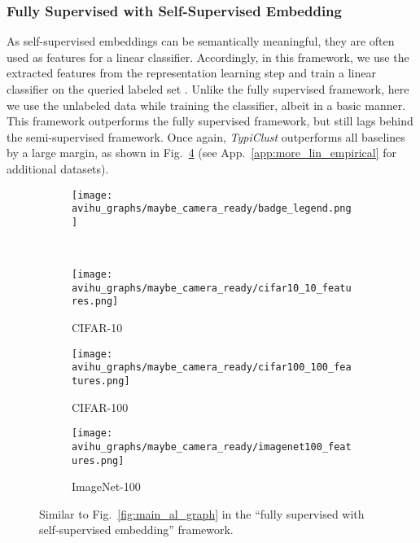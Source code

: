 \documentclass{article}
\newcommand{\app}{App.}
\begin{document}
\subsubsection{Fully Supervised with Self-Supervised Embedding} 
\label{sec:fwork:(ii)}
As self-supervised embeddings can be semantically meaningful, they are often used as features for a linear classifier. Accordingly, in this framework, we use the extracted features from the representation learning step and train a linear classifier on the queried labeled set . Unlike the fully supervised framework, here we use the unlabeled data while training the classifier, albeit in a basic manner. This framework outperforms the fully supervised framework, but still lags behind the semi-supervised framework. Once again, \textit{TypiClust} outperforms all baselines by a large margin, as shown in Fig.~\ref{fig:weak_semi} (see \app~\ref{app:more_lin_empirical} for additional datasets). 



\begin{figure}[htb!]
\begin{center}
\begin{subfigure}{.45\textwidth}
  \centering
 \texttt{[image: avihu\_graphs/maybe\_camera\_ready/badge\_legend.png]}
\end{subfigure}
\\
\begin{subfigure}{.157\textwidth}
      \centering
      \texttt{[image: avihu\_graphs/maybe\_camera\_ready/cifar10\_10\_features.png]}
    \vspace{-0.5cm}
    \caption{CIFAR-10}
    \label{fig:weak_semi_cifar10}
    \end{subfigure}
    \begin{subfigure}{.157\textwidth}
      \centering
      \texttt{[image: avihu\_graphs/maybe\_camera\_ready/cifar100\_100\_features.png]}
    \vspace{-0.5cm}
    \caption{CIFAR-100}
    \label{fig:weak_semi_cifar100}
    \end{subfigure}
    \begin{subfigure}{.157\textwidth}
      \centering
      \texttt{[image: avihu\_graphs/maybe\_camera\_ready/imagenet100\_features.png]}
    \vspace{-0.5cm}
    \caption{ImageNet-100}
    \label{fig:weak_semi_imagenet200}
    \end{subfigure}
    \vspace{-0.35cm}
\caption{Similar to Fig.~\ref{fig:main_al_graph} in the ``fully supervised with self-supervised embedding'' framework.}
\label{fig:weak_semi}
\end{center}
\vspace{-.3cm}
\end{figure}
\end{document}
